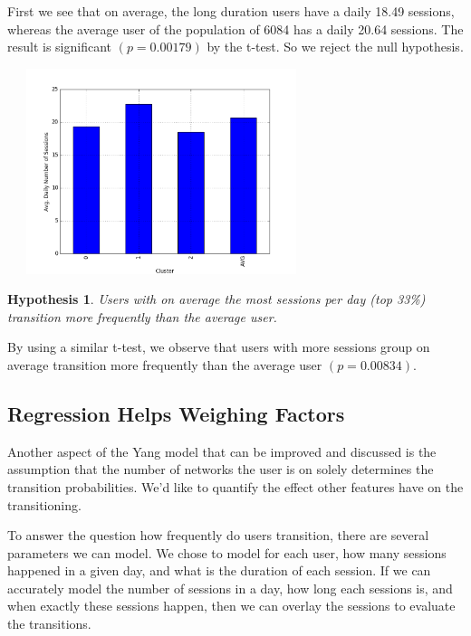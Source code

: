 \documentclass[]{article}
\newenvironment{Figure}
  {\par\medskip\noindent\minipage{\linewidth}}
  {\endminipage\par\medskip}
\newtheorem{hyp}{Hypothesis}
\begin{document}
First we see that on average, the long duration users have a daily 18.49 sessions, whereas the average user of the population of 6084 has a daily 20.64 sessions. The result is significant $(p=0.00179)$ by the t-test. So we reject the null hypothesis.

\begin{Figure}
\centering
 \includegraphics[height = 6cm, width =9cm]{clusteredAVGNUMSESSION.png}
\end{Figure}

\begin{hyp}
Users with on average the most sessions per day (top 33\%) transition more frequently than the average user.
\end{hyp}

By using a similar t-test, we observe that users with more sessions group on average transition more frequently than the average user $(p = 0.00834)$.

\subsection{Regression Helps Weighing Factors}

Another aspect of the Yang model that can be improved and discussed is the assumption that the number of networks the user is on solely determines the transition probabilities. We'd like to quantify the effect other features have on the transitioning.

To answer the question how frequently do users transition, there are several parameters we can model. We chose to model for each user, how many sessions happened in a given day, and what is the duration of each session. If we can accurately model the number of sessions in a day, how long each sessions is, and when exactly these sessions happen, then we can overlay the sessions to evaluate the transitions.
\end{document}
